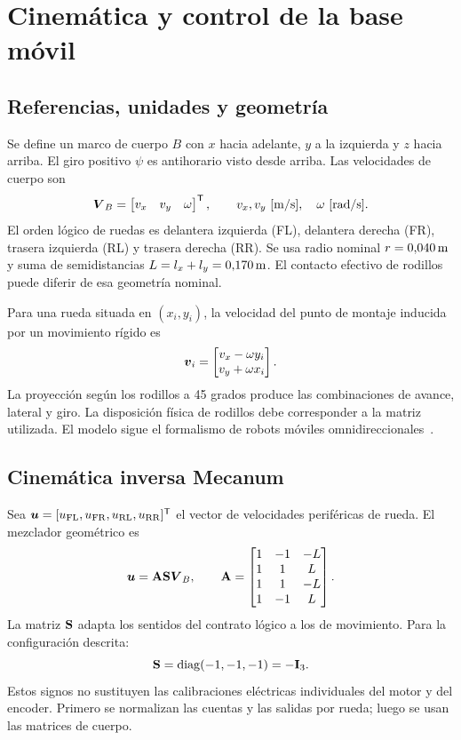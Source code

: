 \chapter{Cinemática y control de la base móvil}
\label{cap:movilidad}

\section{Referencias, unidades y geometría}
Se define un marco de cuerpo $B$ con $x$ hacia adelante, $y$ a la izquierda y $z$ hacia arriba. El giro positivo $\psi$ es antihorario visto desde arriba. Las velocidades de cuerpo son
\begin{equation}
\boldsymbol{V}_B=\begin{bmatrix}v_x&v_y&\omega\end{bmatrix}^{\mathsf{T}},
\qquad v_x,v_y\ [\mathrm{m/s}],\quad\omega\ [\mathrm{rad/s}].
\end{equation}
El orden lógico de ruedas es delantera izquierda (FL), delantera derecha (FR), trasera izquierda (RL) y trasera derecha (RR). Se usa radio nominal $r=0{,}040\,\mathrm{m}$ y suma de semidistancias $L=l_x+l_y=0{,}170\,\mathrm{m}$. El contacto efectivo de rodillos puede diferir de esa geometría nominal.

Para una rueda situada en $(x_i,y_i)$, la velocidad del punto de montaje inducida por un movimiento rígido es
\begin{equation}
\boldsymbol{v}_i=\begin{bmatrix}v_x-\omega y_i\\v_y+\omega x_i\end{bmatrix}.
\end{equation}
La proyección según los rodillos a 45 grados produce las combinaciones de avance, lateral y giro. La disposición física de rodillos debe corresponder a la matriz utilizada. El modelo sigue el formalismo de robots móviles omnidireccionales~\cite{omni}.

\section{Cinemática inversa Mecanum}
Sea $\boldsymbol{u}=[u_{\mathrm{FL}},u_{\mathrm{FR}},u_{\mathrm{RL}},u_{\mathrm{RR}}]^{\mathsf{T}}$ el vector de velocidades periféricas de rueda. El mezclador geométrico es
\begin{equation}
\boldsymbol{u}=\mathbf{A}\mathbf{S}\boldsymbol{V}_B,
\qquad
\mathbf{A}=\begin{bmatrix}
1&-1&-L\\1&1&L\\1&1&-L\\1&-1&L
\end{bmatrix}.
\label{eq:mecanum}
\end{equation}
La matriz $\mathbf{S}$ adapta los sentidos del contrato lógico a los de movimiento. Para la configuración descrita:
\begin{equation}
\mathbf{S}=\operatorname{diag}(-1,-1,-1)=-\mathbf{I}_3.
\end{equation}
Estos signos no sustituyen las calibraciones eléctricas individuales del motor y del encoder. Primero se normalizan las cuentas y las salidas por rueda; luego se usan las matrices de cuerpo.

